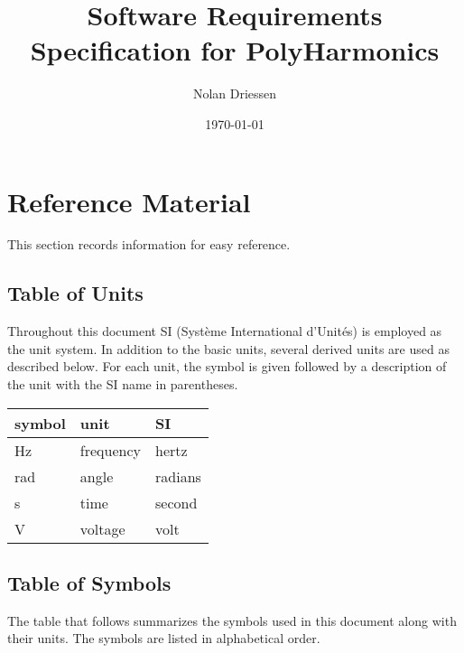 \documentclass[12pt]{article}
\newcommand{\progname}{PolyHarmonics}
\begin{document}
\title{Software Requirements Specification for \progname} 
\author{Nolan Driessen}
\date{\today}
	
\maketitle

\tableofcontents

\section{Reference Material}

This section records information for easy reference.

\subsection{Table of Units}

Throughout this document SI (Syst\`{e}me International d'Unit\'{e}s) is employed
as the unit system.  In addition to the basic units, several derived units are
used as described below.  For each unit, the symbol is given followed by a
description of the unit with the SI name in parentheses.
\newline 

\renewcommand{\arraystretch}{1.2}
  \noindent \begin{tabular}{l l l} 
    \toprule		
    \textbf{symbol} & \textbf{unit} & \textbf{SI}\\
    \midrule 
    \si{\hertz} & frequency & hertz\\
    \si{\radian} &	angle	& radians\\
    \si{\second} & time & second\\
	\si{\volt} & voltage & volt\\
    \bottomrule
  \end{tabular}

\subsection{Table of Symbols}

The table that follows summarizes the symbols used in this document along with 
their units.  The symbols are listed in alphabetical order.
\end{document}
